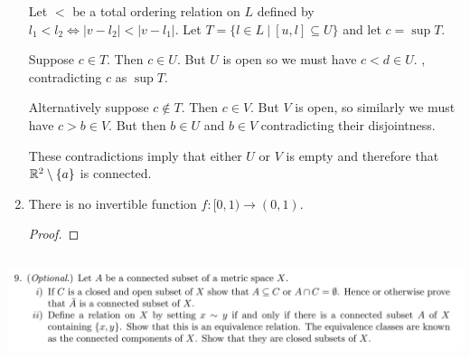\documentclass[12pt]{article}
\begin{document}
\begin{enumerate}[label=(\roman*)]
\begin{mdframed}
    Let $<$ be a total ordering relation on $L$ defined by $l_1 < l_2 \iff |v - l_2| < |v -
    l_1|$. Let $T = \{l \in L ~|~ [u, l] \subseteq U\}$ and let $c = \sup T$.

    Suppose $c \in T$. Then $c \in U$. But $U$ is open so we must have $c < d \in U$. , contradicting $c$ as $\sup T$.

    Alternatively suppose $c \notin T$. Then $c \in V$. But $V$ is open, so similarly we must have
    $c > b \in V$. But then $b \in U$ and $b \in V$ contradicting their disjointness.

    These contradictions imply that either $U$ or $V$ is empty and therefore that
    $\mathbb{R}^2 \setminus \{a\}$ is connected.
  \end{mdframed}
\newpage
\item
  \begin{claim*}
    There is no invertible function $f:[0, 1) \to (0, 1)$.
  \end{claim*}
  \begin{proof}

  \end{proof}
\end{enumerate}


\subsection{}
\begin{mdframed}
\includegraphics[width=400pt]{img/oxford-a2-2-9.png}
\end{mdframed}
\end{document}
